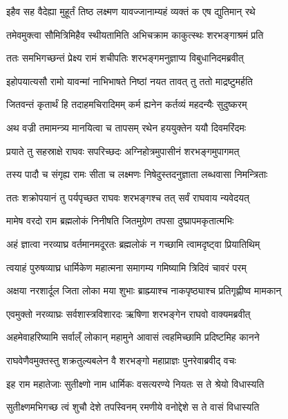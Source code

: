 \twolineshloka
{इहैव सह वैदेह्या मुहूर्तं तिष्ठ लक्ष्मण}
{यावज्जानाम्यहं व्यक्तं क एष द्युतिमान् रथे} %

\twolineshloka
{तमेवमुक्त्वा सौमित्रिमिहैव स्थीयतामिति}
{अभिचक्राम काकुत्स्थः शरभङ्गाश्रमं प्रति} %

\twolineshloka
{ततः समभिगच्छन्तं प्रेक्ष्य रामं शचीपतिः}
{शरभङ्गमनुज्ञाप्य विबुधानिदमब्रवीत्} %

\twolineshloka
{इहोपयात्यसौ रामो यावन्मां नाभिभाषते}
{निष्ठां नयत तावत् तु ततो माद्रष्टुमर्हति} %

\twolineshloka
{जितवन्तं कृतार्थं हि तदाहमचिरादिमम्}
{कर्म ह्यनेन कर्तव्यं महदन्यैः सुदुष्करम्} %

\twolineshloka
{अथ वज्री तमामन्त्र्य मानयित्वा च तापसम्}
{रथेन हययुक्तेन ययौ दिवमरिंदमः} %

\twolineshloka
{प्रयाते तु सहस्राक्षे राघवः सपरिच्छदः}
{अग्निहोत्रमुपासीनं शरभङ्गमुपागमत्} %

\twolineshloka
{तस्य पादौ च संगृह्य रामः सीता च लक्ष्मणः}
{निषेदुस्तदनुज्ञाता लब्धवासा निमन्त्रिताः} %

\twolineshloka
{ततः शक्रोपयानं तु पर्यपृच्छत राघवः}
{शरभङ्गश्च तत् सर्वं राघवाय न्यवेदयत्} %

\twolineshloka
{मामेष वरदो राम ब्रह्मलोकं निनीषति}
{जितमुग्रेण तपसा दुष्प्रापमकृतात्मभिः} %

\twolineshloka
{अहं ज्ञात्वा नरव्याघ्र वर्तमानमदूरतः}
{ब्रह्मलोकं न गच्छामि त्वामदृष्ट्वा प्रियातिथिम्} %

\twolineshloka
{त्वयाहं पुरुषव्याघ्र धार्मिकेण महात्मना}
{समागम्य गमिष्यामि त्रिदिवं चावरं परम्} %

\twolineshloka
{अक्षया नरशार्दूल जिता लोका मया शुभाः}
{ब्राह्म्याश्च नाकपृष्ठ्याश्च प्रतिगृह्णीष्व मामकान्} %

\twolineshloka
{एवमुक्तो नरव्याघ्रः सर्वशास्त्रविशारदः}
{ऋषिणा शरभङ्गेन राघवो वाक्यमब्रवीत्} %

\twolineshloka
{अहमेवाहरिष्यामि सर्वाल्ँ लोकान् महामुने}
{आवासं त्वहमिच्छामि प्रदिष्टमिह कानने} %

\twolineshloka
{राघवेणैवमुक्तस्तु शक्रतुल्यबलेन वै}
{शरभङ्गो महाप्राज्ञः पुनरेवाब्रवीद् वचः} %

\twolineshloka
{इह राम महातेजाः सुतीक्ष्णो नाम धार्मिकः}
{वसत्यरण्ये नियतः स ते श्रेयो विधास्यति} %

\twolineshloka
{सुतीक्ष्णमभिगच्छ त्वं शुचौ देशे तपस्विनम्}
{रमणीये वनोद्देशे स ते वासं विधास्यति} %

